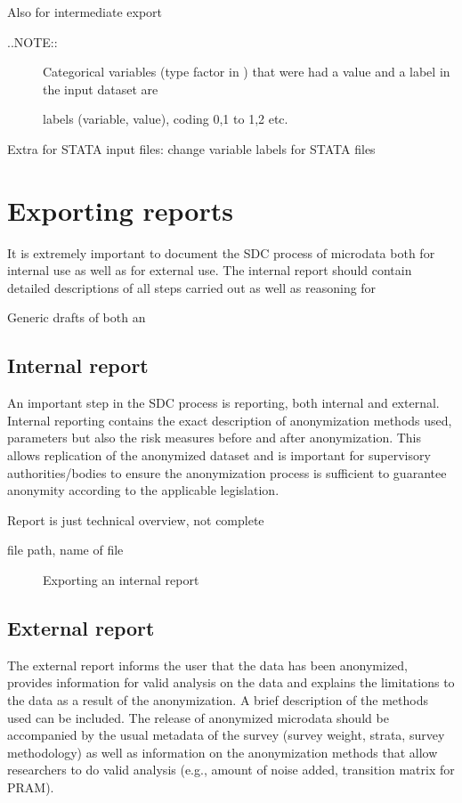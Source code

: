 \documentclass[letterpaper,10pt,english]{sphinxmanual}
\begin{document}
Also for intermediate export
\begin{description}
\item[{..NOTE::}] \leavevmode
Categorical variables (type factor in ) that were had a value and a
label in the input dataset are

labels (variable, value), coding 0,1 to 1,2 etc.

\end{description}

Extra for STATA input files: change variable labels for STATA files


\section{Exporting reports}
\label{\detokenize{export:exporting-reports}}
It is extremely important to document the SDC process of microdata both for internal
use as well as for external use. The internal report should contain detailed descriptions
of all steps carried out as well as reasoning for

Generic drafts of both an


\subsection{Internal report}
\label{\detokenize{export:internal-report}}
An important step in the SDC process is reporting, both internal and external.
Internal reporting contains the exact description of anonymization methods used,
parameters but also the risk measures before and after anonymization. This allows
replication of the anonymized dataset and is important for supervisory authorities/bodies
to ensure the anonymization process is sufficient to guarantee anonymity according
to the applicable legislation.

Report is just technical overview, not complete

file path, name of file

\begin{figure}[htbp]
\centering
\capstart

\noindent{}
\caption{Exporting an internal report}\label{\detokenize{export:fig103}}\label{\detokenize{export:id2}}\end{figure}


\subsection{External report}
\label{\detokenize{export:external-report}}
The external report informs the user that the data has been anonymized,
provides information for valid analysis on the data and explains the limitations to
the data as a result of the anonymization. A brief description of the methods used
can be included. The release of anonymized microdata should be accompanied by the
usual metadata of the survey (survey weight, strata, survey methodology) as well as
information on the anonymization methods that allow researchers to do valid analysis
(e.g., amount of noise added, transition matrix for PRAM).
\end{document}
